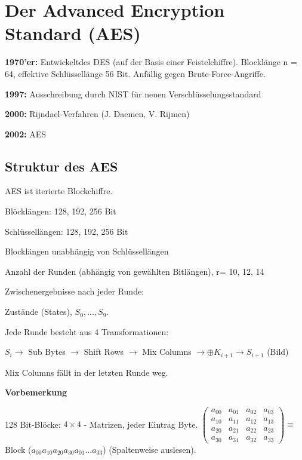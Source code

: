\chapter{Der Advanced Encryption Standard (AES)}

\textbf{1970'er:} Entwickeltdes DES (auf der Basis einer Feistelchiffre). Blocklänge n = 64, effektive Schlüssellänge 56 Bit. Anfällig gegen Brute-Force-Angriffe.

\par \medskip

\textbf{1997:} Ausschreibung durch NIST für neuen Verschlüsselungsstandard 

\par \medskip

\textbf{2000:} Rijndael-Verfahren (J. Daemen, V. Rijmen)

\par \medskip

\textbf{2002:} AES 

\section{Struktur des AES}

AES ist iterierte Blockchiffre.

Blöcklängen: 128, 192, 256 Bit

Schlüssellängen: 128, 192, 256 Bit 

Blocklängen unabhängig von Schlüssellängen

Anzahl der Runden (abhängig von gewählten Bitlängen), r= 10, 12, 14

\par \medskip

Zwischenergebnisse nach jeder Runde:

Zustände (States), $S_0, ..., S_9$.

Jede Runde besteht aus 4 Transformationen:

\par \medskip

$S_i \rightarrow$ Sub Bytes $\rightarrow $ Shift Rows $\rightarrow $ Mix Columns $\rightarrow \oplus K_{i+1} \rightarrow S_{i+1}$ (Bild)

\par \medskip

Mix Columns fällt in der letzten Runde weg.

\textbf{Vorbemerkung}

128 Bit-Blöcke: $4 \times 4$ - Matrizen, jeder Eintrag Byte.  $\begin{pmatrix}a_{00} & a_{01} & a_{02} & a_{03} \\ a_{10} & a_{11} & a_{12} & a_{13} \\ a_{20} & a_{21} & a_{22} & a_{23} \\ a_{30} & a_{31} & a_{32} & a_{33} \end{pmatrix} \equiv$  Block ($a_{00}a_{10}a_{20}a_{30}a_{01}...a_{33}$) (Spaltenweise auslesen).

